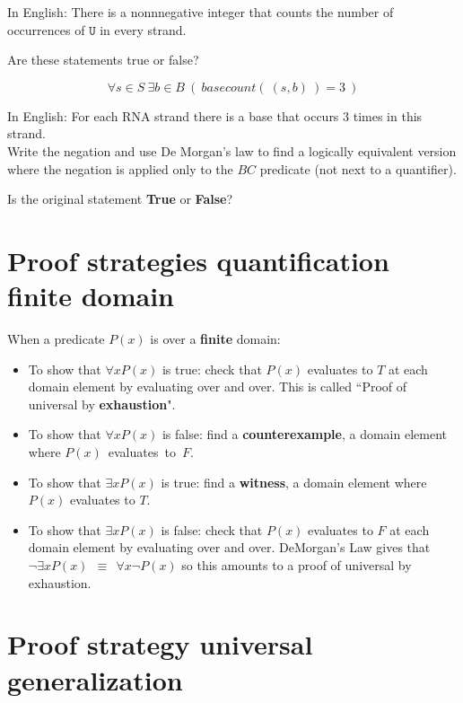 \documentclass[12pt, oneside]{article}
\newcommand{\U}[0]{\texttt{U}}
\begin{document}
In English: There is a nonnnegative integer that counts the number of occurrences of $\U$ in every 
strand.\\

\vfill

Are these statements true or false?

\newpage

$$\forall s \in S ~\exists b\in B ~(~basecount(~(s,b)~) = 3~)$$

In English: For each RNA strand there is a base that occurs 3 times in this strand.\\

Write the negation and use De Morgan's law to find a 
logically equivalent version where the negation is applied only to the 
$BC$ predicate (not next to a quantifier).

\vspace{60pt}


Is the original statement {\bf True} or {\bf False}?

\vfill
 \vfill
\section*{Proof strategies quantification finite domain}


When a predicate $P(x)$ is over a {\bf finite} domain:
\begin{itemize}
\item To show that $\forall x  P(x)$ is true: check that $P(x)$ evaluates to $T$ at each domain element by evaluating over and over. 
This is called ``Proof of universal by {\bf exhaustion}".
\item To show that $\forall x  P(x)$ is false: find a {\bf counterexample}, a domain element where $P(x)$~evaluates~to~$F$.
\item To show that $\exists x  P(x)$ is true: find a {\bf witness}, a domain element where $P(x)$ evaluates to $T$.
\item To show that $\exists x  P(x)$ is false: check that $P(x)$ evaluates to $F$ at each domain element by evaluating over and over.
DeMorgan's Law gives that $\lnot \exists x P(x) ~~\equiv~~ \forall x \lnot P(x)$ so this amounts to a proof of universal by exhaustion.
\end{itemize} \vfill
\section*{Proof strategy universal generalization}


 \vfill
\end{document}
